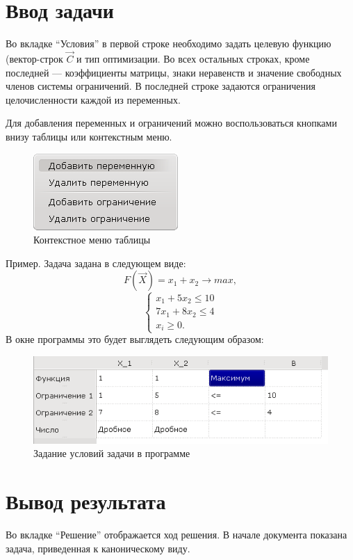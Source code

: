 \documentclass[pdftex, unicode, a4paper,12pt,oneside,utf8x, usehyperref]{report-gost}
\begin{document}
\section{Ввод задачи}
Во вкладке “Условия” в первой строке необходимо задать целевую функцию (вектор-строк $\vec{C}$ и тип оптимизации.
Во всех остальных строках, кроме последней ---  коэффициенты матрицы, знаки неравенств и значение свободных членов системы ограничений. В последней строке задаются ограничения целочисленности каждой из переменных.

Для добавления переменных и ограничений можно воспользоваться кнопками внизу таблицы или контекстным меню.
\begin{figure}[ht]
\centering
\includegraphics[scale=1.0]{img/contextmenu.png}
\caption{Контекстное меню таблицы}
\end{figure}

Пример. Задача задана в следующем виде:
\begin{equation}
 	F(\vec{X}) = x_1+x_2 \to max,
\end{equation}
\begin{equation}
\begin{cases}
x_1 + 5x_2 \le 10\\
7x_1 + 8x_2 \le 4\\
x_i \ge 0.
\end{cases}
\end{equation}
\clearpage
В окне программы это будет выглядеть следующим образом:
\begin{figure}[ht]
\centering
\includegraphics[scale=1.0]{img/problem1.png}
\caption{Задание условий задачи в программе}
\end{figure}

\section{Вывод результата}
Во вкладке “Решение” отображается ход решения. В начале документа показана задача, приведенная к каноническому виду.
\end{document}
